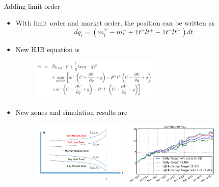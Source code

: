 \begin{frame}{Adding limit order}
\begin{itemize}

\item With limit order and market order, the position can be written as 
$$
dq_t=(m_t^+-m_t^-+1t^+lt^+-1t^-lt^-)dt
$$
\item New HJB equation is 
\begin{figure}

\centering
\includegraphics[height=2cm]{img/HJB2.png}

\end{figure}

\item New zones and simulation results are

\begin{figure}
\centering
\begin{minipage}[c]{0.4\textwidth}
\centering
\includegraphics[height=3.2cm]{img/5zones.png}
\end{minipage}%
\begin{minipage}[c]{0.4\textwidth}
\centering
\includegraphics[height=3.2cm]{img/p&l2.png}
\end{minipage}
\end{figure}

\end{itemize}
\end{frame}



